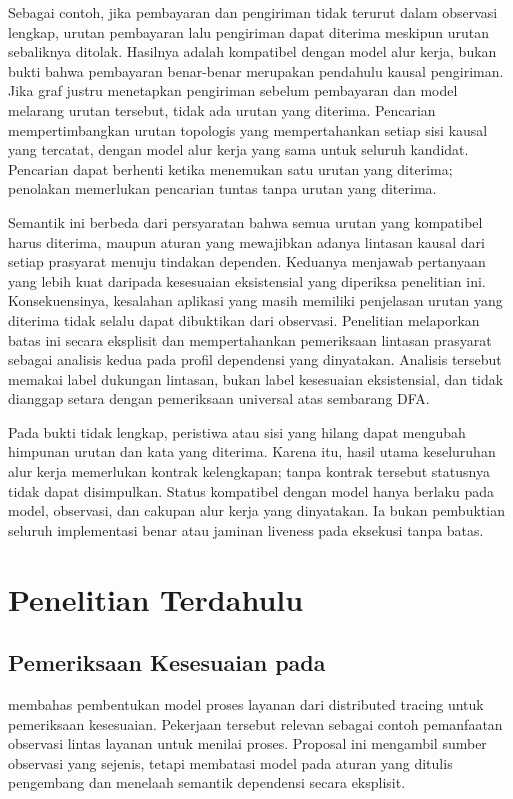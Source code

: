 Sebagai contoh, jika pembayaran dan pengiriman tidak terurut dalam observasi lengkap, urutan pembayaran lalu pengiriman dapat diterima meskipun urutan sebaliknya ditolak. Hasilnya adalah kompatibel dengan model alur kerja, bukan bukti bahwa pembayaran benar-benar merupakan pendahulu kausal pengiriman. Jika graf justru menetapkan pengiriman sebelum pembayaran dan model melarang urutan tersebut, tidak ada urutan yang diterima. Pencarian mempertimbangkan urutan topologis yang mempertahankan setiap sisi kausal yang tercatat, dengan model alur kerja yang sama untuk seluruh kandidat. Pencarian dapat berhenti ketika menemukan satu urutan yang diterima; penolakan memerlukan pencarian tuntas tanpa urutan yang diterima.

Semantik ini berbeda dari persyaratan bahwa semua urutan yang kompatibel harus diterima, maupun aturan yang mewajibkan adanya lintasan kausal dari setiap prasyarat menuju tindakan dependen. Keduanya menjawab pertanyaan yang lebih kuat daripada kesesuaian eksistensial yang diperiksa penelitian ini. Konsekuensinya, kesalahan aplikasi yang masih memiliki penjelasan urutan yang diterima tidak selalu dapat dibuktikan dari observasi. Penelitian melaporkan batas ini secara eksplisit dan mempertahankan pemeriksaan lintasan prasyarat sebagai analisis kedua pada profil dependensi yang dinyatakan. Analisis tersebut memakai label dukungan lintasan, bukan label kesesuaian eksistensial, dan tidak dianggap setara dengan pemeriksaan universal atas sembarang DFA.

Pada bukti tidak lengkap, peristiwa atau sisi yang hilang dapat mengubah himpunan urutan dan kata yang diterima. Karena itu, hasil utama keseluruhan alur kerja memerlukan kontrak kelengkapan; tanpa kontrak tersebut statusnya tidak dapat disimpulkan. Status kompatibel dengan model hanya berlaku pada model, observasi, dan cakupan alur kerja yang dinyatakan. Ia bukan pembuktian seluruh implementasi benar atau jaminan liveness pada eksekusi tanpa batas.

\section{Penelitian Terdahulu}
\subsection{Pemeriksaan Kesesuaian pada }
\citet{sakai2022} membahas pembentukan model proses layanan dari distributed tracing untuk pemeriksaan kesesuaian. Pekerjaan tersebut relevan sebagai contoh pemanfaatan observasi lintas layanan untuk menilai proses. Proposal ini mengambil sumber observasi yang sejenis, tetapi membatasi model pada aturan yang ditulis pengembang dan menelaah semantik dependensi secara eksplisit.

